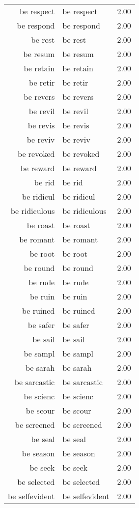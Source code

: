 \begin{table}[ht]
\begin{tabular}{rlr}
  be respect & be respect & 2.00 \\ 
  be respond & be respond & 2.00 \\ 
  be rest & be rest & 2.00 \\ 
  be resum & be resum & 2.00 \\ 
  be retain & be retain & 2.00 \\ 
  be retir & be retir & 2.00 \\ 
  be revers & be revers & 2.00 \\ 
  be revil & be revil & 2.00 \\ 
  be revis & be revis & 2.00 \\ 
  be reviv & be reviv & 2.00 \\ 
  be revoked & be revoked & 2.00 \\ 
  be reward & be reward & 2.00 \\ 
  be rid & be rid & 2.00 \\ 
  be ridicul & be ridicul & 2.00 \\ 
  be ridiculous & be ridiculous & 2.00 \\ 
  be roast & be roast & 2.00 \\ 
  be romant & be romant & 2.00 \\ 
  be root & be root & 2.00 \\ 
  be round & be round & 2.00 \\ 
  be rude & be rude & 2.00 \\ 
  be ruin & be ruin & 2.00 \\ 
  be ruined & be ruined & 2.00 \\ 
  be safer & be safer & 2.00 \\ 
  be sail & be sail & 2.00 \\ 
  be sampl & be sampl & 2.00 \\ 
  be sarah & be sarah & 2.00 \\ 
  be sarcastic & be sarcastic & 2.00 \\ 
  be scienc & be scienc & 2.00 \\ 
  be scour & be scour & 2.00 \\ 
  be screened & be screened & 2.00 \\ 
  be seal & be seal & 2.00 \\ 
  be season & be season & 2.00 \\ 
  be seek & be seek & 2.00 \\ 
  be selected & be selected & 2.00 \\ 
  be selfevident & be selfevident & 2.00 \\ 

\end{tabular}
\end{table}
